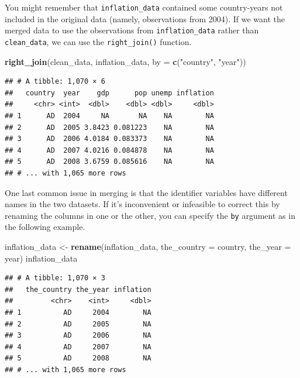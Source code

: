 \documentclass[12pt,oneside,openany]{book}
\newenvironment{Shaded}{\begin{snugshade}}{\end{snugshade}}
\newcommand{\KeywordTok}[1]{\textcolor[rgb]{0.13,0.29,0.53}{\textbf{{#1}}}}
\newcommand{\DataTypeTok}[1]{\textcolor[rgb]{0.13,0.29,0.53}{{#1}}}
\newcommand{\StringTok}[1]{\textcolor[rgb]{0.31,0.60,0.02}{{#1}}}
\newcommand{\NormalTok}[1]{{#1}}
\begin{document}
You might remember that \texttt{inflation\_data} contained some
country-years not included in the original data (namely, observations
from 2004). If we want the merged data to use the observations from
\texttt{inflation\_data} rather than \texttt{clean\_data}, we can use
the \texttt{right\_join()} function.

\begin{Shaded}
\begin{Highlighting}[]
\KeywordTok{right_join}\NormalTok{(clean_data,}
           \NormalTok{inflation_data,}
           \DataTypeTok{by =} \KeywordTok{c}\NormalTok{(}\StringTok{"country"}\NormalTok{, }\StringTok{"year"}\NormalTok{))}
\end{Highlighting}
\end{Shaded}

\begin{verbatim}
## # A tibble: 1,070 × 6
##   country  year    gdp      pop unemp inflation
##     <chr> <int>  <dbl>    <dbl> <dbl>     <dbl>
## 1      AD  2004     NA       NA    NA        NA
## 2      AD  2005 3.8423 0.081223    NA        NA
## 3      AD  2006 4.0184 0.083373    NA        NA
## 4      AD  2007 4.0216 0.084878    NA        NA
## 5      AD  2008 3.6759 0.085616    NA        NA
## # ... with 1,065 more rows
\end{verbatim}

One last common issue in merging is that the identifier variables have
different names in the two datasets. If it's inconvenient or infeasible
to correct this by renaming the columns in one or the other, you can
specify the \texttt{by} argument as in the following example.

\begin{Shaded}
\begin{Highlighting}[]
\NormalTok{inflation_data <-}\StringTok{ }\KeywordTok{rename}\NormalTok{(inflation_data,}
                         \DataTypeTok{the_country =} \NormalTok{country,}
                         \DataTypeTok{the_year =} \NormalTok{year)}
\NormalTok{inflation_data}
\end{Highlighting}
\end{Shaded}

\begin{verbatim}
## # A tibble: 1,070 × 3
##   the_country the_year inflation
##         <chr>    <int>     <dbl>
## 1          AD     2004        NA
## 2          AD     2005        NA
## 3          AD     2006        NA
## 4          AD     2007        NA
## 5          AD     2008        NA
## # ... with 1,065 more rows
\end{verbatim}
\end{document}
